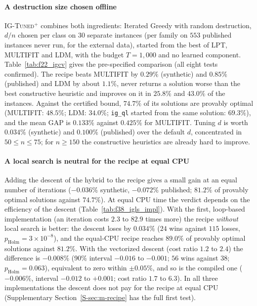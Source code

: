 \paragraph{A destruction size chosen offline}
\textsc{IG-Tuned}$^{+}$ combines both ingredients: Iterated Greedy with
random destruction, $d/n$ chosen per class on $30$ separate instances (per family on $553$ published instances never run, for the external data), started from the best of LPT, MULTIFIT and LDM,
with the budget $T=1{,}000$ and no learned component. Table~\ref{tab:f22_igcv} gives the pre-specified comparison (all eight tests confirmed). The recipe beats MULTIFIT by
$0.29\%$ (synthetic) and $0.85\%$ (published) and LDM by about $1.1\%$, never returns a solution worse than the best constructive heuristic and improves on it in $25.8\%$ and $43.0\%$ of the
instances. Against the certified bound, $74.7\%$ of its solutions are provably optimal (MULTIFIT: $48.5\%$; LDM: $34.0\%$; \texttt{ig\_ql} started from the same solution: $69.3\%$), and the mean GAP is $0.133\%$ against $0.425\%$ for MULTIFIT.
Tuning $d$ is worth $0.034\%$ (synthetic) and $0.100\%$ (published) over the default $d$, concentrated in $50\leq n\leq75$; for $n\geq150$ the constructive heuristics are already hard to improve.



\paragraph{A local search is neutral for the recipe at equal CPU}
Adding the descent of the hybrid to the recipe gives a small gain at an equal number of iterations ($-0.036\%$ synthetic, $-0.072\%$ published; $81.2\%$ of provably optimal solutions against $74.7\%$). At equal CPU time the verdict depends on the efficiency of the
descent (Table~\ref{tab:f38_igls_impl}). With the first, loop-based implementation (an iteration costs $2.3$ to $82.9$ times more) the recipe \emph{without} local search is better: the descent loses by $0.034\%$ ($24$ wins against $115$ losses,
$p_{\mathrm{Holm}}=3\times10^{-8}$), and the equal-CPU recipe reaches $89.0\%$ of provably optimal solutions against $81.2\%$. With the vectorized descent (cost ratio $1.2$ to $2.4$) the difference is $-0.008\%$ (90\% interval $-0.016$ to $-0.001$; $56$ wins against $38$;
$p_{\mathrm{Holm}}=0.063$), equivalent to zero within $\pm0.05\%$, and so is the compiled one ($-0.006\%$, interval $-0.012$ to $+0.001$; cost ratio $1.7$ to $6.3$). In all three implementations the descent does not pay for the recipe at equal CPU (Supplementary Section~\ref{S-sec:m-recipe} has the full first test).


